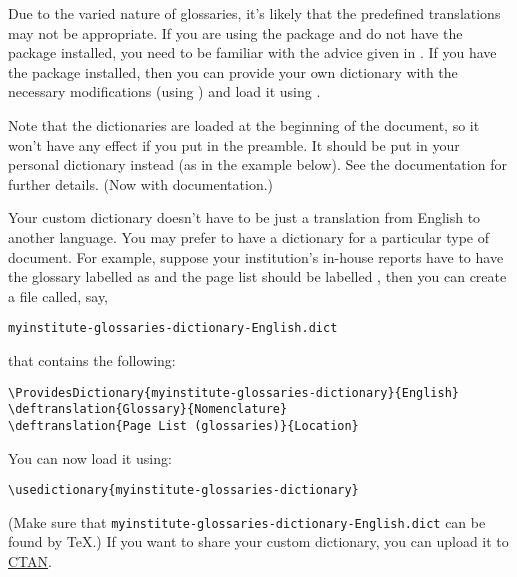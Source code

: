 \documentclass[report]{nlctdoc}
\begin{document}
Due to the varied nature of glossaries, it's likely that the
predefined translations may not be appropriate. If you are using the
 package and do not have the  package
installed, you need to be familiar with the advice given in
. If you have the  package
installed, then you can provide your own dictionary with the
necessary modifications (using ) and load it
using .

\begin{important}
Note that the dictionaries are loaded at the beginning of the
document, so it won't have any effect if you put 
in the preamble. It should be put in your personal dictionary
instead (as in the example below). See the 
documentation for further details. (Now with 
documentation.)
\end{important}

Your custom dictionary doesn't have to be just a translation from
English to another language. You may prefer to have a dictionary for
a particular type of document. For example, suppose your
institution's in-house reports have to have the glossary labelled as
 and the page list should be labelled
, then you can create a file called, say,
\begin{verbatim}
myinstitute-glossaries-dictionary-English.dict
\end{verbatim}
that contains the following:
\begin{verbatim}
\ProvidesDictionary{myinstitute-glossaries-dictionary}{English}
\deftranslation{Glossary}{Nomenclature}
\deftranslation{Page List (glossaries)}{Location}
\end{verbatim}
You can now load it using:
\begin{verbatim}
\usedictionary{myinstitute-glossaries-dictionary}
\end{verbatim}
(Make sure that \texttt{myinstitute-glossaries-dictionary-English.dict}
can be found by \TeX.) If you want to share your custom dictionary,
you can upload it to \href{http://www.ctan.org/}{CTAN}.
\end{document}
